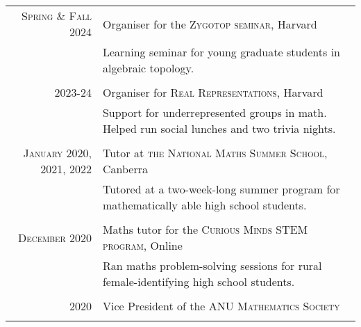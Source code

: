 \documentclass[a4paper,11pt]{article} %
\begin{document}
\begin{tabular}{r|p{12cm}}

\textsc{Spring \& Fall 2024} & Organiser for the \textsc{Zygotop seminar}, Harvard \emph{}\\
& \footnotesize{Learning seminar for young graduate students in algebraic topology.}\\
\multicolumn{2}{c}{} \\


\textsc{2023-24} & Organiser for \textsc{Real Representations}, Harvard \emph{}\\
& \footnotesize{Support for underrepresented groups in math. Helped run social lunches and two trivia nights.}\\
\multicolumn{2}{c}{} \\


\textsc{January 2020, 2021, 2022} & Tutor at \textsc{the National Maths Summer School}, Canberra \emph{}\\
& \footnotesize{Tutored at a two-week-long summer program for mathematically able high school students.}\\
\multicolumn{2}{c}{} \\


\textsc{December 2020} & Maths tutor for the \textsc{Curious Minds STEM program}, Online \emph{}\\
& \footnotesize{Ran maths problem-solving sessions for rural female-identifying high school students.}\\
\multicolumn{2}{c}{} \\


\textsc{2020} & Vice President of the \textsc{ANU Mathematics Society}\\
\multicolumn{2}{c}{} \\



\end{tabular}
\end{document}
